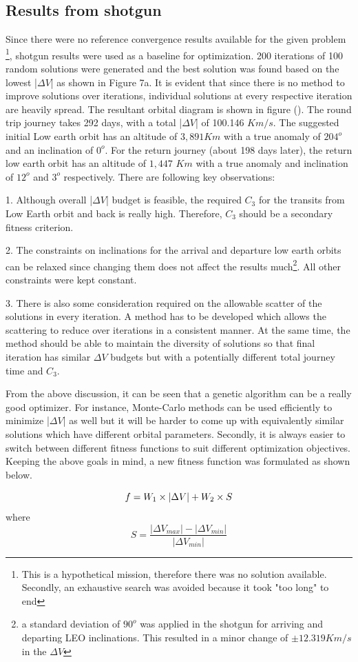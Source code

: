 \documentclass[11pt,a4paper]{article}
\begin{document}
\begin{multicols}{2}
\subsection{Results from shotgun}
Since there were no reference convergence results available for the given problem \footnote{This is a hypothetical mission, therefore there was no solution available. Secondly, an exhaustive search was avoided because it took "too long" to end}, shotgun results were used as a baseline for optimization. 200 iterations of 100 random solutions were generated and the best solution was found based on the lowest |$\Delta V$| as shown in Figure 7a. It is evident that since there is no method to improve solutions over iterations, individual solutions at every respective iteration are heavily spread. The resultant orbital diagram is shown in figure (). The round trip journey takes 292 days, with a total |$\Delta V$| of  100.146 $Km/s$. The suggested initial Low earth orbit has an altitude of $3,891 Km$ with a true anomaly of $204^o$ and an inclination of $0^o$. For the return journey (about 198 days later), the return low earth orbit has an altitude of $1,447$ $Km$ with a true anomaly and inclination of $12^o$ and $3^o$ respectively. There are following key observations:

1. Although overall |$\Delta V$| budget is feasible, the required $C_3$ for the transits from Low Earth orbit and back is really high. Therefore, $C_3$ should be a secondary fitness criterion.

2. The constraints on inclinations for the arrival and departure low earth orbits can be relaxed since changing them does not affect the results much\footnote{a standard deviation of $90^o$ was applied in the shotgun for arriving and departing LEO inclinations. This resulted in a minor change of $\pm 12.319 Km/s$ in the $\Delta V$}. All other constraints were kept constant.

3. There is also some consideration required on the allowable scatter of the solutions in every iteration. A method has to be developed which allows the scattering to reduce over iterations in a consistent manner. At the same time, the method should be able to maintain the diversity of solutions so that final iteration has similar $\Delta V$ budgets but with a potentially different total journey time and $C_3$.

From the above discussion, it can be seen that a genetic algorithm can be a really good optimizer. For instance, Monte-Carlo methods can be used efficiently to minimize |$\Delta V$| as well but it will be harder to come up with equivalently similar solutions which have different orbital parameters. Secondly, it is always easier to switch between different fitness functions to suit different optimization objectives. Keeping the above goals in mind, a new fitness function was formulated as shown below.

$$\\f=W_1\times|\Delta V| + W_2\times S$$
where
$$S= \frac{|\Delta V_{max}| - |\Delta V_{min}|}{|\Delta V_{min}|}$$
\end{multicols}
\end{document}
